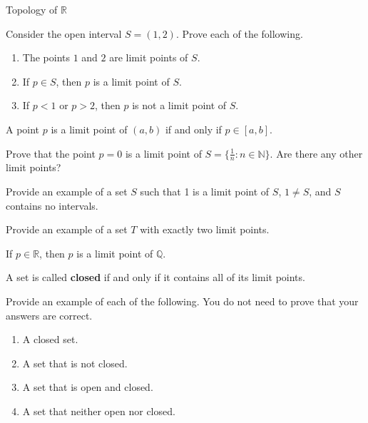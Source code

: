 \begin{section}{Topology of $\mathbb{R}$}
\begin{problem}
Consider the open interval $S=(1,2)$. Prove each of the following.
\begin{enumerate}[label=\textrm{(\alph*)}]
\item The points $1$ and $2$ are limit points of $S$.
\item If $p\in S$, then $p$ is a limit point of $S$.
\item If $p<1$ or $p>2$, then $p$ is not a limit point of $S$.
\end{enumerate}
\end{problem}

\begin{theorem}
A point $p$ is a limit point of $(a,b)$ if and only if $p\in [a,b]$.
\end{theorem}

\begin{problem}
Prove that the point $p=0$ is a limit point of $S=\{\frac{1}{n}: n \in \mathbb{N}\}$.  Are there any other limit points?
\end{problem}

\begin{exercise}
Provide an example of a set $S$ such that 1 is a limit point of $S$, $1\neq S$, and $S$ contains no intervals.
\end{exercise}

\begin{exercise}
Provide an example of a set $T$ with exactly two limit points.
\end{exercise}

\begin{theorem}
If $p\in\mathbb{R}$, then $p$ is a limit point of $\mathbb{Q}$.
\end{theorem}

\begin{definition}
A set is called \textbf{closed} if and only if it contains all of its limit points.
\end{definition}

\begin{exercise}
Provide an example of each of the following.  You do not need to prove that your answers are correct.
\begin{enumerate}[label=\textrm{(\alph*)}]
\item A closed set.
\item A set that is not closed.
\item A set that is open and closed.
\item A set that neither open nor closed.
\end{enumerate}


\end{exercise}
\end{section}
